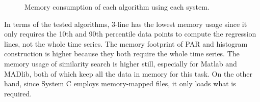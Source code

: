\documentclass[prodmode,acmtods]{acmsmall}
\begin{document}
\begin{figure*}[t]
 \centering
\hspace{-10pt}   
   \hspace{-10pt}   
  \hspace{-10pt}      
 \caption{Memory consumption of each algorithm using each system.}
  \label{fig:memoneserver}
\end{figure*}

In terms of the tested algorithms, 3-line has the lowest memory usage since it only requires the 10th and 90th percentile data points to compute the regression lines, not the whole time series.  The memory footprint of PAR and histogram construction is higher because they both require the whole time series. The memory usage of similarity search is higher still, especially for Matlab and MADlib, both of which keep all the data in memory for this task.  On the other hand, since System C employs memory-mapped files, it only loads what is required.
\end{document}
